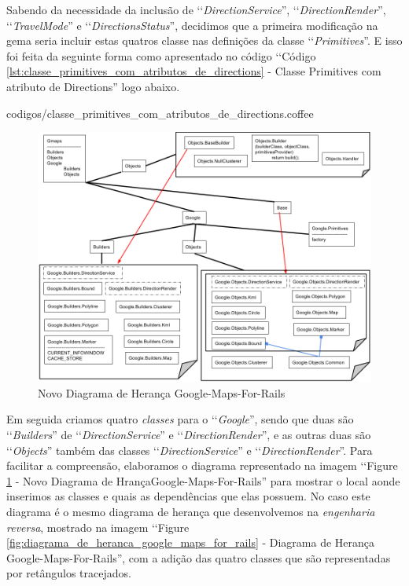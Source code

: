 Sabendo da necessidade da inclusão de ‘‘\emph{DirectionService}'', ‘‘\emph{DirectionRender}'',
‘‘\emph{TravelMode}'' e ‘‘\emph{DirectionsStatus}'', decidimos que a primeira modificação na gema seria 
incluir estas quatros classe nas definições da classe ‘‘\emph{Primitives}''. E isso foi 
feita da seguinte forma como apresentado no código ‘‘Código 
\ref{lst:classe_primitives_com_atributos_de_directions} - Classe Primitives com atributo de Directions'' 
logo abaixo.


{codigos/classe_primitives_com_atributos_de_directions.coffee}

\begin{figure}[ht]
  \includegraphics[scale=0.48]{images/novo_diagrama_de_heranca_google_maps_for_rails.png}
  \caption{Novo Diagrama de Herança Google-Maps-For-Rails}
  \label{fig:novo_diagrama_de_heranca_google_maps_for_rails}
\end{figure}

Em seguida criamos quatro \emph{classes} para o ‘‘\emph{Google}'', sendo que duas são ‘‘\emph{Builders}'' de 
‘‘\emph{DirectionService}'' e ‘‘\emph{DirectionRender}'', e as outras duas são ‘‘\emph{Objects}'' também das 
classes ‘‘\emph{DirectionService}'' e ‘‘\emph{DirectionRender}''. Para facilitar a compreensão, elaboramos o 
diagrama representado na imagem ‘‘Figure \ref{fig:novo_diagrama_de_heranca_google_maps_for_rails} - Novo 
Diagrama de HrançaGoogle-Maps-For-Rails'' para mostrar o local aonde inserimos as classes e quais as 
dependências que elas possuem. No caso este diagrama é o mesmo diagrama de herança que desenvolvemos na 
\emph{engenharia reversa}, mostrado na imagem ‘‘Figure \ref{fig:diagrama_de_heranca_google_maps_for_rails} - 
Diagrama de Herança Google-Maps-For-Rails'', com a adição das quatro classes que são representadas 
por retângulos tracejados.

